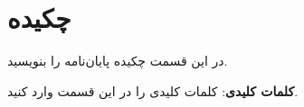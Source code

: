 \clearpage
\section*{چکیده}
در این قسمت چکیده پایان‌نامه را بنویسید.

\vskip 5mm
\noindent\textbf{کلمات کلیدی}:
کلمات کلیدی را در این قسمت وارد کنید. 